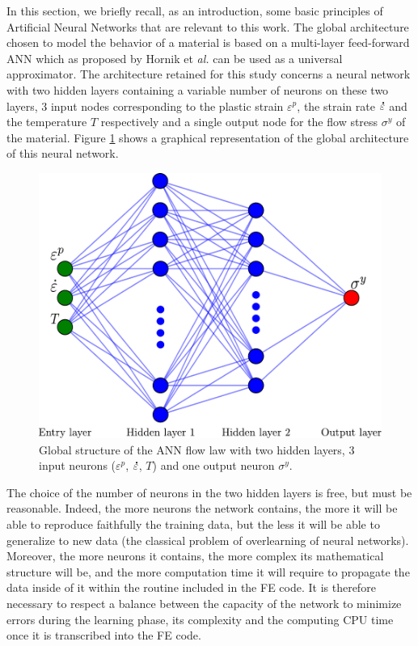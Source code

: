 \documentclass[algorithms,article,submit,pdftex,moreauthors]{Definitions/mdpi}
\makeatletter
\DeclareRobustCommand{\mdot}[1]{\accentset{\mbox{\bfseries .}}{#1}}
\DeclareRobustCommand{\eal}{et \emph{al.}\@\xspace}
\makeatother
\begin{document}
In this section, we briefly recall, as an introduction, some basic principles of Artificial Neural Networks that are relevant to this work.
The global architecture chosen to model the behavior of a material is based on a multi-layer feed-forward ANN which as proposed by Hornik \eal \cite{Hornik-1989} can be used as a universal approximator.
The architecture retained for this study concerns a neural network with two hidden layers containing a variable number of neurons on these two layers, $3$ input nodes corresponding to the plastic strain $\varepsilon^p$, the strain rate $\mdot\varepsilon$ and the temperature $T$ respectively and a single output node for the flow stress $\sigma^y$ of the material.
Figure \ref{fig:ANN-scheme} shows a graphical representation of the global architecture of this neural network.
\begin{figure}[!ht]
\centering
\includegraphics[width=0.7\columnwidth]{Figures/ANN-scheme-2HL}
\caption{Global structure of the ANN flow law with two hidden layers, 3 input neurons ($\varepsilon^p$, $\mdot\varepsilon$, $T$) and one output neuron $\sigma^y$.}
\label{fig:ANN-scheme}
\end{figure}
The choice of the number of neurons in the two hidden layers is free, but must be reasonable.
Indeed, the more neurons the network contains, the more it will be able to reproduce faithfully the training data, but the less it will be able to generalize to new data (the classical problem of overlearning of neural networks).
Moreover, the more neurons it contains, the more complex its mathematical structure will be, and the more computation time it will require to propagate the data inside of it within the routine included in the FE code.
It is therefore necessary to respect a balance between the capacity of the network to minimize errors during the learning phase, its complexity and the computing CPU time once it is transcribed into the FE code.
\end{document}
